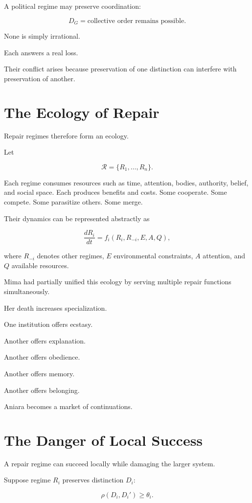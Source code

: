 \documentclass[11pt,oneside]{book}
\theoremstyle{definition}
\theoremstyle{remark}
\begin{document}
A political regime may preserve coordination:

\[
D_G
=
\text{collective order remains possible}.
\]

None is simply irrational.

Each answers a real loss.

Their conflict arises because preservation of one distinction can interfere with preservation of another.

\section{The Ecology of Repair}

Repair regimes therefore form an ecology.

Let

\[
\mathcal R
=
\{R_1,\ldots,R_n\}.
\]

Each regime consumes resources such as time, attention, bodies, authority, belief, and social space. Each produces benefits and costs. Some cooperate. Some compete. Some parasitize others. Some merge.

Their dynamics can be represented abstractly as

\[
\frac{dR_i}{dt}
=
f_i(
R_i,
R_{-i},
E,
A,
Q
),
\]

where \(R_{-i}\) denotes other regimes, \(E\) environmental constraints, \(A\) attention, and \(Q\) available resources.

Mima had partially unified this ecology by serving multiple repair functions simultaneously.

Her death increases specialization.

One institution offers ecstasy.

Another offers explanation.

Another offers obedience.

Another offers memory.

Another offers belonging.

Aniara becomes a market of continuations.

\section{The Danger of Local Success}

A repair regime can succeed locally while damaging the larger system.

Suppose regime \(R_i\) preserves distinction \(D_i\):

\[
\rho(D_i,D_i')\geq\theta_i.
\]
\end{document}
